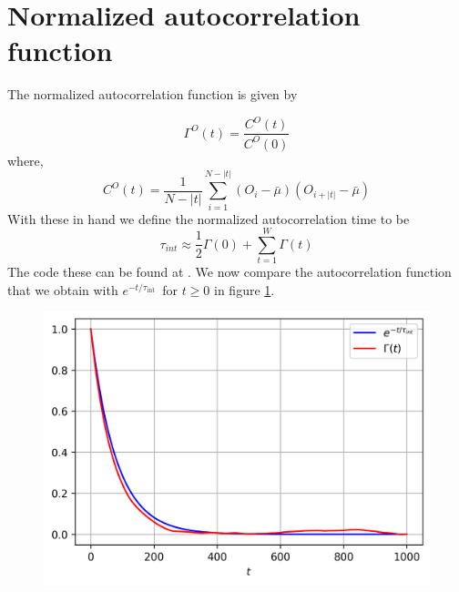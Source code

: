 \documentclass{cernatsnote}
\begin{document}
\section{Normalized autocorrelation function}
The normalized autocorrelation function is given by

\begin{equation}
    \Gamma^{O}(t) = \frac{C^{O}(t)}{C^{O}(0)}
\end{equation}
where,
\begin{equation}
    C^{O}(t) = \frac{1}{N-|t|} \sum_{i=1}^{N-|t|}\left(O_i-\bar{\mu}\right)\left(O_{i+|t|}-\bar{\mu}\right)
\end{equation}
With these in hand we define the normalized autocorrelation time to be
\begin{equation}
    \tau_{i n t} \approx \frac{1}{2} \Gamma(0)+\sum_{t=1}^W \Gamma(t)
\end{equation}
The code these can be found at \cite{github}. We now compare the autocorrelation function that we obtain with $e^{-t / \tau_{\text {int }}}$ for $t \geq 0$ in figure \ref{fig:autocorr}.
\begin{figure}[H]
    \centering
    \includegraphics[scale = 0.8]{images/corr_v_e.png}
    \label{fig:autocorr}
\end{figure}
\end{document}
